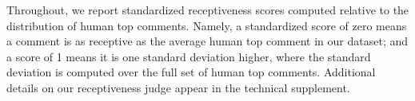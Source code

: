 \documentclass[letterpaper]{article} %
\begin{document}
Throughout, we report standardized receptiveness scores computed relative to the distribution of human top comments. Namely, 
a standardized score of zero means a comment is as receptive as the average human top comment in our dataset; and a score of 1 means it is one standard deviation higher, where the standard deviation is computed over the full set of human top comments.
Additional details on our receptiveness judge appear in the technical supplement.


\end{document}
